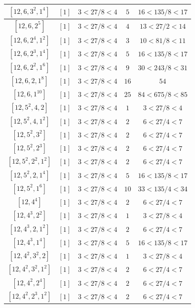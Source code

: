 \documentclass{article}%
\begin{document}
\begin{center}
\begin{longtable}{||c|c|c|c|c||}
$[12, 6, 3^{2}, 1^{4}]$ & $[1]$ & $3 < 27/8 < 4$ & $5$ & $16 < 135/8 < 17$ \\ \hline 
$[12, 6, 2^{5}]$ & $[1]$ & $3 < 27/8 < 4$ & $4$ & $13 < 27/2 < 14$ \\ \hline 
$[12, 6, 2^{4}, 1^{2}]$ & $[1]$ & $3 < 27/8 < 4$ & $3$ & $10 < 81/8 < 11$ \\ \hline 
$[12, 6, 2^{3}, 1^{4}]$ & $[1]$ & $3 < 27/8 < 4$ & $5$ & $16 < 135/8 < 17$ \\ \hline 
$[12, 6, 2^{2}, 1^{6}]$ & $[1]$ & $3 < 27/8 < 4$ & $9$ & $30 < 243/8 < 31$ \\ \hline 
$[12, 6, 2, 1^{8}]$ & $[1]$ & $3 < 27/8 < 4$ & $16$ & $54$ \\ \hline 
$[12, 6, 1^{10}]$ & $[1]$ & $3 < 27/8 < 4$ & $25$ & $84 < 675/8 < 85$ \\ \hline 
$[12, 5^{2}, 4, 2]$ & $[1]$ & $3 < 27/8 < 4$ & $1$ & $3 < 27/8 < 4$ \\ \hline 
$[12, 5^{2}, 4, 1^{2}]$ & $[1]$ & $3 < 27/8 < 4$ & $2$ & $6 < 27/4 < 7$ \\ \hline 
$[12, 5^{2}, 3^{2}]$ & $[1]$ & $3 < 27/8 < 4$ & $2$ & $6 < 27/4 < 7$ \\ \hline 
$[12, 5^{2}, 2^{3}]$ & $[1]$ & $3 < 27/8 < 4$ & $2$ & $6 < 27/4 < 7$ \\ \hline 
$[12, 5^{2}, 2^{2}, 1^{2}]$ & $[1]$ & $3 < 27/8 < 4$ & $2$ & $6 < 27/4 < 7$ \\ \hline 
$[12, 5^{2}, 2, 1^{4}]$ & $[1]$ & $3 < 27/8 < 4$ & $5$ & $16 < 135/8 < 17$ \\ \hline 
$[12, 5^{2}, 1^{6}]$ & $[1]$ & $3 < 27/8 < 4$ & $10$ & $33 < 135/4 < 34$ \\ \hline 
$[12, 4^{4}]$ & $[1]$ & $3 < 27/8 < 4$ & $2$ & $6 < 27/4 < 7$ \\ \hline 
$[12, 4^{3}, 2^{2}]$ & $[1]$ & $3 < 27/8 < 4$ & $1$ & $3 < 27/8 < 4$ \\ \hline 
$[12, 4^{3}, 2, 1^{2}]$ & $[1]$ & $3 < 27/8 < 4$ & $2$ & $6 < 27/4 < 7$ \\ \hline 
$[12, 4^{3}, 1^{4}]$ & $[1]$ & $3 < 27/8 < 4$ & $5$ & $16 < 135/8 < 17$ \\ \hline 
$[12, 4^{2}, 3^{2}, 2]$ & $[1]$ & $3 < 27/8 < 4$ & $1$ & $3 < 27/8 < 4$ \\ \hline 
$[12, 4^{2}, 3^{2}, 1^{2}]$ & $[1]$ & $3 < 27/8 < 4$ & $2$ & $6 < 27/4 < 7$ \\ \hline 
$[12, 4^{2}, 2^{4}]$ & $[1]$ & $3 < 27/8 < 4$ & $2$ & $6 < 27/4 < 7$ \\ \hline 
$[12, 4^{2}, 2^{3}, 1^{2}]$ & $[1]$ & $3 < 27/8 < 4$ & $2$ & $6 < 27/4 < 7$ \\ \hline 

\end{longtable}
\end{center}
\end{document}
